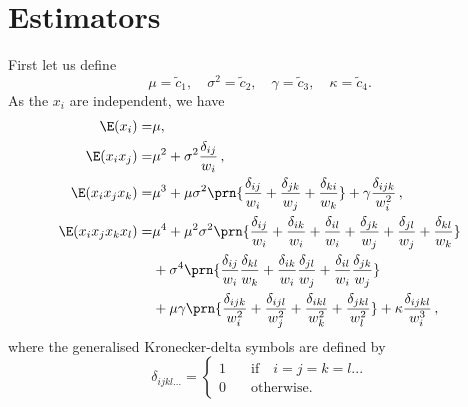 \documentclass[12pt]{article}
\newcommand{\tk}{\tilde c}
\begin{document}
\section{Estimators}

First let us define
%
\begin{equation}\label{eq:defcum}
  \mu = \tk_1,\quad
  \sigma^2 = \tk_2, \quad
  \gamma = \tk_3, \quad
  \kappa = \tk_4.
\end{equation}
%
As the $x_i$ are independent, we have
%
\begin{equation}\label{eq:polyexp}
  \begin{aligned}
    \E(x_i) =& \mu,\\
    \E(x_i x_j) =& \mu^2
        + \sigma^2 \frac{\delta_{ij}}{w_i}\,,\\
    \E(x_i x_j x_k) =& \mu^3
        + \mu\sigma^2 \prn{\frac{\delta_{ij}}{w_i} +\frac{\delta_{jk}}{w_j} +\frac{\delta_{ki}}{w_k}}
        + \gamma \frac{\delta_{ijk}}{w_i^2}\,,\\
    \E(x_i x_j x_k x_l) =& \mu^4
        + \mu^2\sigma^2 \prn{\frac{\delta_{ij}}{w_i} +\frac{\delta_{ik}}{w_i} +\frac{\delta_{il}}{w_i} +\frac{\delta_{jk}}{w_j} +\frac{\delta_{jl}}{w_j} +\frac{\delta_{kl}}{w_k}}
        \\ &+ \sigma^4  \prn{\frac{\delta_{ij}}{w_i}\frac{\delta_{kl}}{w_k} +\frac{\delta_{ik}}{w_i}\frac{\delta_{jl}}{w_j} +\frac{\delta_{il}}{w_i}\frac{\delta_{jk}}{w_j}}
        \\ &+ \mu\gamma \prn{\frac{\delta_{ijk}}{w_i^2} +\frac{\delta_{ijl}}{w_j^2} +\frac{\delta_{ikl}}{w_k^2} +\frac{\delta_{jkl}}{w_l^2}}
        + \kappa \frac{\delta_{ijkl}}{w_i^3}\,,
  \end{aligned}
\end{equation}
%
where the generalised Kronecker-delta symbols are defined by
%
\begin{equation}\label{eq:kronecker}
  \delta_{ijkl...} = \left\{
  \begin{aligned}
    1\quad &\text{if}\quad i=j=k=l...\\
    0\quad &\text{otherwise}.
  \end{aligned}
  \right.
\end{equation}
%
\end{document}
